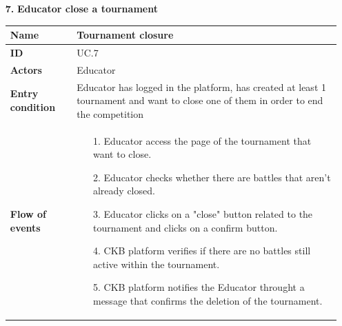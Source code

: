 \documentclass{article}
\begin{document}
{\begin{enumerate}
                    \item[\textbf{7.}] \textbf{Educator close a tournament}
                    \begin{xltabular}{\textwidth}
                        {| >{\raggedright\arraybackslash}g | >{\raggedright\arraybackslash}X |}      
                        \hline
                        \endfirsthead
                        \hline
                        \endhead
                        \endfoot
                        \hline
                        \endlastfoot
                        

                        
                        
                        \textbf{Name} & Tournament closure\\
                        \hline
                        \textbf{ID} & UC.7\\
                        \hline
                        \textbf{Actors} & Educator\\
                        \hline
                        \textbf{Entry condition} & Educator has logged in the platform, has created at least 1 tournament
                        and want to close one of them in order to end the competition \\
                        \hline
                        \textbf{Flow of events} &    \begin{enumerate}
                                                        \item[1.] Educator access the page of the tournament 
                                                        that want to close.
                                                        \item[2.] Educator checks whether there are battles that
                                                        aren't already closed.
                                                        \item[3.] Educator clicks on a "close" button related to
                                                        the tournament and clicks on a confirm button.
                                                        \item[4.] CKB platform verifies if there are no battles
                                                        still active within the tournament.
                                                        \item[5.] CKB platform notifies the Educator throught 
                                                        a message that confirms the deletion of the tournament.

\end{enumerate}
\end{xltabular}
\end{enumerate}}
\end{document}

